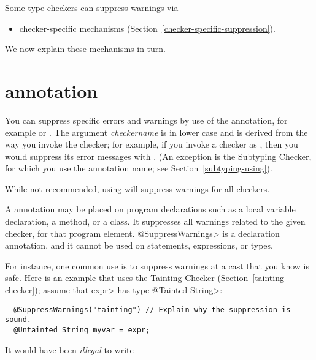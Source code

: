 Some type checkers can suppress warnings via
\begin{itemize}
\item
  checker-specific mechanisms (Section~\ref{checker-specific-suppression}).
\end{itemize}

\noindent
We now explain these mechanisms in turn.


\section{ annotation\label{suppresswarnings-annotation}}

You can suppress specific errors and warnings by use of the
 annotation, for example
 or .
The argument \emph{checkername} is in lower case and is derived from the
way you invoke the checker; for example, if you invoke a checker as
, then you would suppress its
error messages with .  (An exception is
the Subtyping Checker, for which you use the annotation name; see
Section~\ref{subtyping-using}).

While not recommended, using  will
suppress warnings for all checkers.

A 
annotation may be placed on program declarations such as a local
variable declaration, a method, or a class.  It suppresses all warnings
related to the given checker, for that program element.
\<@SuppressWarnings> is a declaration annotation, and it cannot be used on
statements, expressions, or types.

For instance, one common use is
to suppress warnings at a cast that you know is safe.  Here is an example
that uses the Tainting Checker (Section~\ref{tainting-checker}); assume
that \<expr> has type \<@Tainted String>:

\begin{Verbatim}
  @SuppressWarnings("tainting") // Explain why the suppression is sound.
  @Untainted String myvar = expr;
\end{Verbatim}

\noindent
It would have been \emph{illegal} to write

